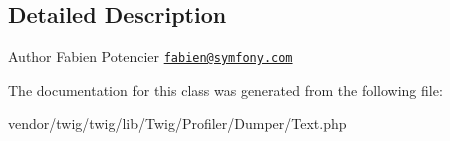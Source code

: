 \subsection{Detailed Description}
\begin{DoxyAuthor}{Author}
Fabien Potencier \href{mailto:fabien@symfony.com}{\tt fabien@symfony.\+com} 
\end{DoxyAuthor}


The documentation for this class was generated from the following file\+:\begin{DoxyCompactItemize}
\item 
vendor/twig/twig/lib/\+Twig/\+Profiler/\+Dumper/Text.\+php\end{DoxyCompactItemize}
